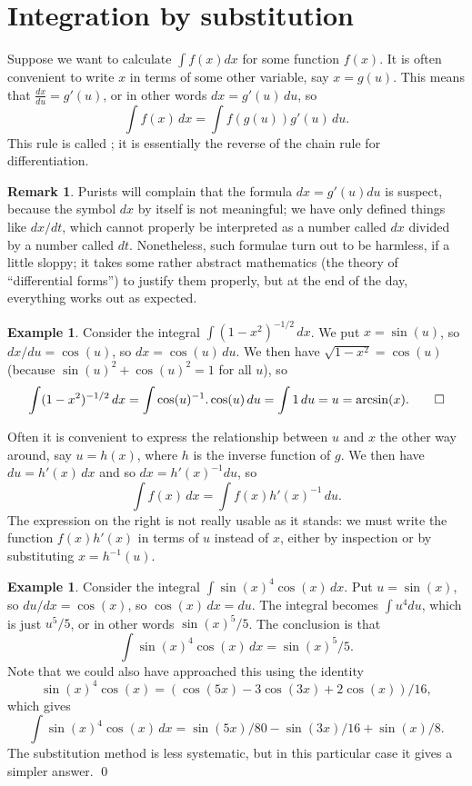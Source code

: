 \documentclass[a4paper]{book}
\theoremstyle{definition}
\newtheorem{remark}[theorem]{Remark}
\newtheorem{example}[theorem]{Example}
\begin{document}
\section{Integration by substitution}
\label{sec-int-subs}

Suppose we want to calculate $\int f(x)dx$ for some function $f(x)$.
It is often convenient to write $x$ in terms of some other variable,
say $x=g(u)$.  This means that $\frac{dx}{du}=g'(u)$, or in other
words $dx=g'(u)\,du$, so
\[ \int f(x)\, dx = \int f(g(u)) g'(u)\, du. \]
This rule is called ; it is
essentially the reverse of the chain rule for differentiation.
\begin{remark}
 Purists will complain that the formula $dx=g'(u)du$ is suspect,
 because the symbol $dx$ by itself is not meaningful; we have only
 defined things like $dx/dt$, which cannot properly be interpreted as
 a number called $dx$ divided by a number called $dt$.  Nonetheless,
 such formulae turn out to be harmless, if a little sloppy; it takes
 some rather abstract mathematics (the theory of ``differential
 forms'') to justify them properly, but at the end of the day,
 everything works out as expected.
\end{remark}
\begin{example}
 Consider the integral $\int(1-x^2)^{-1/2}\,dx$.  We put $x=\sin(u)$,
 so $dx/du=\cos(u)$, so $dx=\cos(u)\,du$.  We then have
 $\sqrt{1-x^2}=\cos(u)$ (because $\sin(u)^2+\cos(u)^2=1$ for all $u$),
 so
 \[ \int (1-x^2)^{-1/2}\,dx = \int \cos(u)^{-1}.\cos(u)\,du
     = \int 1\,du = u = \arcsin(x). \qed
 \]
\end{example}

Often it is convenient to express the relationship between $u$ and $x$
the other way around, say $u=h(x)$, where $h$ is the inverse function
of $g$.  We then have $du=h'(x)\,dx$ and so $dx=h'(x)^{-1}du$, so 
\[ \int f(x)\, dx = \int f(x) h'(x)^{-1} \, du. \]
The expression on the right is not really usable as it stands: we must
write the function $f(x)h'(x)$ in terms of $u$ instead of $x$, either
by inspection or by substituting $x=h^{-1}(u)$.
\begin{example}
 Consider the integral $\int\sin(x)^4\cos(x)\,dx$.  Put $u=\sin(x)$,
 so $du/dx=\cos(x)$, so $\cos(x)\,dx=du$.  The integral becomes
 $\int u^4 du$, which is just $u^5/5$, or in other words
 $\sin(x)^5/5$.  The conclusion is that
 \[ \int \sin(x)^4\cos(x)\,dx = \sin(x)^5/5. \]
 Note that we could also have approached this using the identity
 \[ \sin(x)^4\cos(x) = (\cos(5x) - 3\cos(3x) + 2\cos(x))/16, \]
 which gives
 \[ \int\sin(x)^4\cos(x)\,dx =
     \sin(5x)/80 - \sin(3x)/16 + \sin(x)/8.
 \]
 The substitution method is less systematic, but in this particular
 case it gives a simpler answer. \qed
\end{example}
\end{document}
